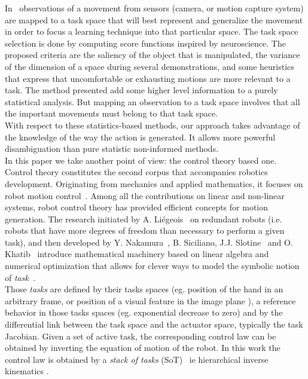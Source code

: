 \documentclass[letterpaper, 10pt, conference]{ieeeconf}      %
\begin{document}
In~\cite{muhlig09} observations of a movement from sensors (camera, or motion capture system)
are mapped to a task space that will best represent and generalize the movement in order to focus
a learning technique into that particular space. The task space selection is
done by computing score functions inspired by neuroscience. The proposed criteria are
the saliency of the object that is manipulated, the variance of the dimension
of a space during several demonstrations, and some heuristics that express that
uncomfortable or exhausting motions are more relevant to a task. The method
presented add some higher level information to a purely statistical analysis. But
mapping an observation to a task space involves that all the important movements must
belong to that task space.\\

With respect to these statistics-based methods, our approach takes advantage of the
knowledge of the way the action is generated. It allows more powerful
disambiguation than pure statistic non-informed methods.\\

In this paper we take another point of view: the control theory based
one. Control theory constitutes the second corpus that accompanies
robotics development. Originating from mechanics and applied
mathematics, it focuses on robot motion control~\cite{murray94,
siciliano10}. Among all the
contributions on linear and non-linear systems, robot control theory has
provided efficient concepts for motion generation. The research
initiated by A. Li\'egeois~\cite{liegeois77} on redundant robots (i.e. robots that have
more degrees of freedom than necessary to perform a given task), and
then developed by Y. Nakamura~\cite{nakamura91}, B. Siciliano, J.J. Slotine~\cite{siciliano91} and O.
Khatib~\cite{khatib87} introduce mathematical machinery based on linear algebra and
numerical optimization that allows for clever ways to model the symbolic
notion of \emph{task}~\cite{samson91}.\\

Those \emph{tasks} are defined by their tasks spaces (eg. position of the hand
in an arbitrary frame\cite{nakamura86a,khatib87b}, or position of a visual feature in the image
plane \cite{espiau92,hutchinson96a}), a reference behavior in those tasks spaces
(eg. exponential decrease to zero) and by the differential link between
the task space and the actuator space, typically the task Jacobian.
Given a set of active task, the corresponding control law can be
obtained by inverting the equation of motion of the robot. In this work
the control law is obtained by a \emph{stack of tasks}
(SoT)~\cite{mansard07} ie hierarchical inverse kinematics
\cite{siciliano91}.\\
\end{document}
